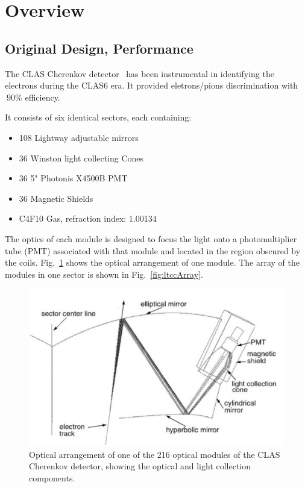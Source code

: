 \section{Overview}



\subsection{Original Design, Performance}

The CLAS Cherenkov detector~\cite{Adams:2001kk} has been instrumental in identifying the electrons during the CLAS6 era.
It provided eletrons/pions discrimination with $~90\%$ efficiency.

It consists of six identical sectors, each containing:

\begin{itemize}
	\item 108 Lightway adjustable mirrors
	\item 36 Winston light collecting Cones
	\item 36 5" Photonis X4500B PMT
	\item 36 Magnetic Shields
	\item C4F10 Gas, refraction index: 1.00134
\end{itemize}


The optics of each module is designed to focus the light onto a photomultiplier tube (PMT) associated with that module and located in the region obscured by the coils.
Fig.~\ref{fig:optics} shows the optical arrangement of one module. The array of the modules in one sector is shown in Fig.~\ref{fig:ltccArray}.

\begin{figure}[hbt]
	\centering
	\includegraphics[width=1.0\columnwidth,keepaspectratio]{img/optics.png}
	\caption{Optical arrangement of one of the 216 optical modules of the CLAS Cherenkov detector, showing the optical and light collection components.}
	\label{fig:optics}
\end{figure}

